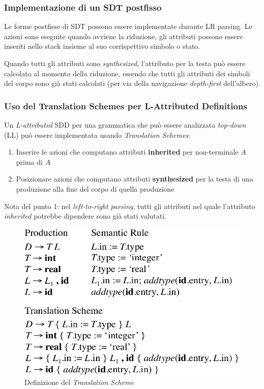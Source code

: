 \subsubsection{Implementazione di un SDT postfisso}
Le forme postfisse di SDT possono essere implementate durante LR parsing. Le
azioni sono eseguite quando avviene la riduzione, gli attributi possono essere
inseriti nello stack insieme al suo corrispettivo simbolo o stato.

Quando tutti gli attributi sono \textit{synthesized}, l'attributo per la testa
pu\`o essere calcolato al momento della riduzione, essendo che tutti gli
attributi dei simboli del corpo sono gi\`a stati calcolati (per via della
navigazione \textit{depth-first} dell'albero).

\subsubsection{Uso del Translation Schemes per L-Attributed Definitions}
Un \textit{L-attributed} SDD per una grammatica che pu\`o essere analizzata
\textit{top-down} (LL) pu\`o essere implementata usando \textit{Translation
Schemes}:
\begin{enumerate}
\item Inserire le azioni che computano attributi \textbf{inherited} per
non-terminale $A$ prima di $A$
\item Posizionare azioni che computano attributi \textbf{synthesized} per la
testa di una produzione alla fine del corpo di quella produzione
\end{enumerate}

Nota del punto 1: nel \textit{left-to-right parsing}, tutti gli attributi nel
quale l'attributo \textit{inherited} potrebbe dipendere sono gi\`a stati
valutati.

\begin{figure}[H]
  \centering
  \includegraphics[scale=0.45]{res/image/translation_Lattribute}
  \caption{Definizione del \textit{Translation Scheme}}
  \label{img:translation_Lattribute}
\end{figure}

